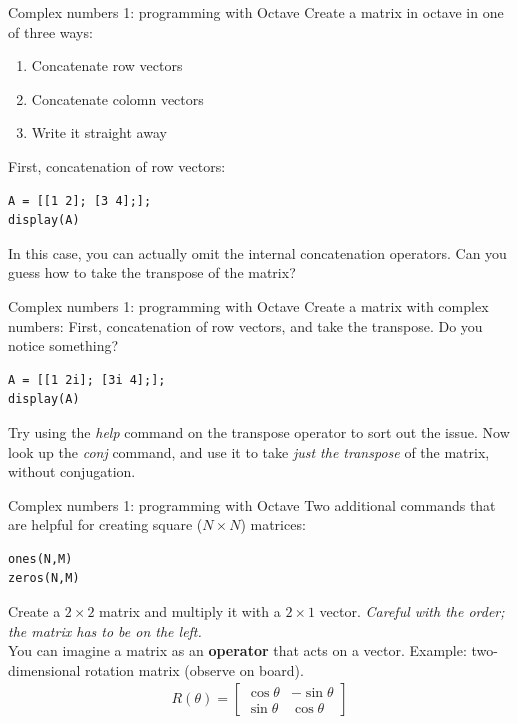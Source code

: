 \documentclass{beamer}
\begin{document}
\begin{frame}[fragile]{Complex numbers 1: programming with Octave}
\small
Create a matrix in octave in one of three ways:
\begin{enumerate}
\item Concatenate row vectors
\item Concatenate colomn vectors
\item \alert{Write it straight away}
\end{enumerate}
First, concatenation of row vectors:
\begin{verbatim}
A = [[1 2]; [3 4];];
display(A)
\end{verbatim}
In this case, you can actually omit the internal concatenation operators.  Can you guess how to take the transpose of the matrix?
\end{frame}

\begin{frame}[fragile]{Complex numbers 1: programming with Octave}
\small
Create a matrix with complex numbers:
First, concatenation of row vectors, and take the transpose.  Do you notice something?
\begin{verbatim}
A = [[1 2i]; [3i 4];];
display(A)
\end{verbatim}
Try using the \textit{help} command on the transpose operator to sort out the issue.  Now look up the \textit{conj} command, and use it to take \textit{just the transpose} of the matrix, without conjugation.
\end{frame}

\begin{frame}[fragile]{Complex numbers 1: programming with Octave}
Two additional commands that are helpful for creating square ($N \times N$) matrices:
\begin{verbatim}
ones(N,M)
zeros(N,M)
\end{verbatim}
Create a $2 \times 2$ matrix and multiply it with a $2 \times 1$ vector.  \textit{Careful with the order; the matrix has to be on the left.} \\ \vspace{0.5cm}
You can imagine a matrix as an \textbf{\alert{operator}} that acts on a vector.  Example: two-dimensional rotation matrix (observe on board).
\begin{gather}
R(\theta) = \begin{bmatrix} \cos\theta & -\sin\theta \\ \sin\theta & \cos\theta \end{bmatrix} \label{eq:R}
\end{gather}
\end{frame}
\end{document}
